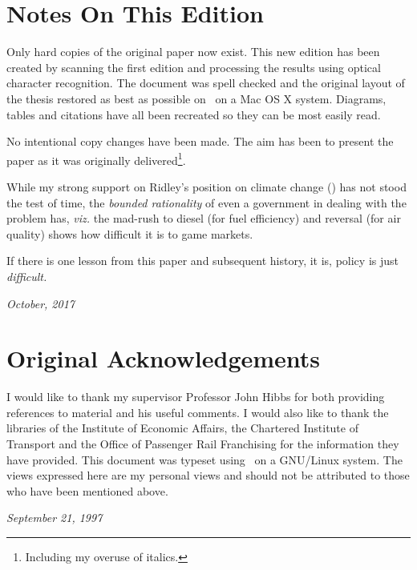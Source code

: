 \thispagestyle{plain}
\section{Notes On This Edition}

Only hard copies of the original paper now exist. This new edition has been created by scanning the first edition and processing the results using optical character recognition. The document was spell checked and the original layout of the thesis restored as best as possible on \XeLaTeX \ on a Mac OS X system. Diagrams, tables and citations have all been recreated so they can be most easily read.

No intentional copy changes have been made. The aim has been to present the paper as it was originally delivered\footnote{Including my overuse of italics.}.

While my strong support on Ridley's position on climate change (\citep{Ridley:1996}) has not stood the test of time, the \textit{bounded rationality} of even a government in dealing with the problem has, \textit{viz.} the mad-rush to diesel (for fuel efficiency) and reversal (for air quality) shows how difficult it is to game markets. 

If there is one lesson from this paper and subsequent history, it is, policy is just \textit{difficult.}

\textit{October, 2017}

\section{Original Acknowledgements}

I would like to thank my supervisor Professor John Hibbs for both providing references to material and his useful comments. I would also like to thank the libraries of the Institute of Economic Affairs, the Chartered Institute of Transport and the Office of Passenger Rail Franchising for the information they have provided. This document was typeset using \LaTeXe  \ on a GNU/Linux system. The views expressed here are my personal views and should not be attributed to those who have been mentioned above.

\textit{September 21, 1997}